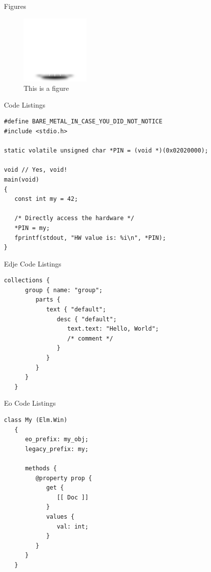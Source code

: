 \documentclass[aspectratio=169]{beamer}
\begin{document}
\begin{frame}{Figures}
   \begin{figure}[h!]\centering
      \includegraphics[scale=0.5]{img/icon-enlightenment}
      \caption{This is a figure}
   \end{figure}
\end{frame}

\begin{frame}[fragile]{Code Listings}
   \begin{lstlisting}
#define BARE_METAL_IN_CASE_YOU_DID_NOT_NOTICE
#include <stdio.h>

static volatile unsigned char *PIN = (void *)(0x02020000);

void // Yes, void!
main(void)
{
   const int my = 42;

   /* Directly access the hardware */
   *PIN = my;
   fprintf(stdout, "HW value is: %i\n", *PIN);
}
   \end{lstlisting}
\end{frame}


\begin{frame}[fragile]{Edje Code Listings}
   \begin{lstlisting}[language=edje]
   collections {
      group { name: "group";
         parts {
            text { "default";
               desc { "default";
                  text.text: "Hello, World";
                  /* comment */
               }
            }
         }
      }
   }
   \end{lstlisting}
\end{frame}

\begin{frame}[fragile]{Eo Code Listings}
   \begin{lstlisting}[language=eo]
   class My (Elm.Win)
   {
      eo_prefix: my_obj;
      legacy_prefix: my;

      methods {
         @property prop {
            get {
               [[ Doc ]]
            }
            values {
               val: int;
            }
         }
      }
   }
   \end{lstlisting}
\end{frame}
\end{document}
